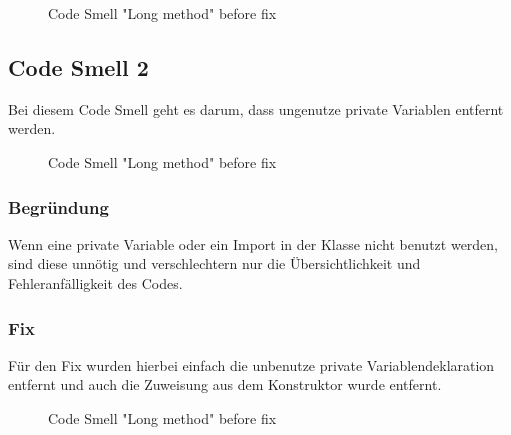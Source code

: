         \begin{figure}[h]
	        \centering
	        \caption{Code Smell "Long method" before fix}
	        \label{a.2.cleanArchitecture}
        \end{figure}
    
    

    \subsection{Code Smell 2}
    Bei diesem Code Smell geht es darum, dass ungenutze private Variablen entfernt werden.
    \begin{figure}[h]
	    \centering
	    \caption{Code Smell "Long method" before fix}
	    \label{a.2.cleanArchitecture}
    \end{figure}

        \subsubsection{Begründung}
        Wenn eine private Variable oder ein Import in der Klasse nicht benutzt werden, sind diese unnötig und verschlechtern nur die Übersichtlichkeit und Fehleranfälligkeit des Codes. 

        \subsubsection{Fix}
        Für den Fix wurden hierbei einfach die unbenutze private Variablendeklaration entfernt und auch die Zuweisung aus dem Konstruktor wurde entfernt.
        \begin{figure}[h]
	        \centering
	        \caption{Code Smell "Long method" before fix}
	        \label{a.2.cleanArchitecture}
        \end{figure}
